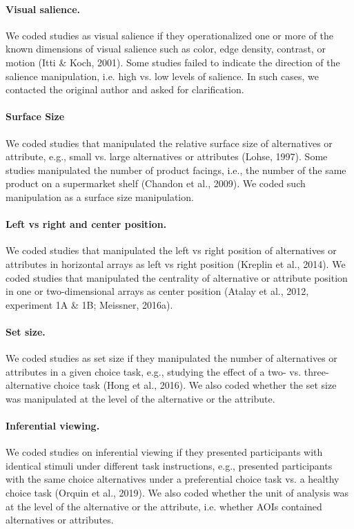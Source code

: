 \documentclass{article}
\begin{document}
\paragraph{Visual salience.} We coded studies as visual salience if they operationalized one or more of the known dimensions of visual salience such as color, edge density, contrast, or motion (Itti & Koch, 2001). Some studies failed to indicate the direction of the salience manipulation, i.e. high vs. low levels of salience. In such cases, we contacted the original author and asked for clarification.

\paragraph{Surface Size} We coded studies that manipulated the relative surface size of alternatives or attribute, e.g., small vs. large alternatives or attributes (Lohse, 1997). Some studies manipulated the number of product facings, i.e., the number of the same product on a supermarket shelf (Chandon et al., 2009). We coded such manipulation as a surface size manipulation. 

\paragraph{Left vs right and center position.} We coded studies that manipulated the left vs right position of alternatives or attributes in horizontal arrays as left vs right position (Kreplin et al., 2014). We coded studies that manipulated the centrality of alternative or attribute position in one or two-dimensional arrays as center position (Atalay et al., 2012, experiment 1A & 1B; Meissner, 2016a).

\paragraph{Set size.} We coded studies as set size if they manipulated the number of alternatives or attributes in a given choice task, e.g., studying the effect of a two- vs. three-alternative choice task (Hong et al., 2016). We also coded whether the set size was manipulated at the level of the alternative or the attribute. 

\paragraph{Inferential viewing.} We coded studies on inferential viewing if they presented participants with identical stimuli under different task instructions, e.g., presented participants with the same choice alternatives under a preferential choice task vs. a healthy choice task (Orquin et al., 2019). We also coded whether the unit of analysis was at the level of the alternative or the attribute, i.e. whether AOIs contained alternatives or attributes. 
\end{document}
